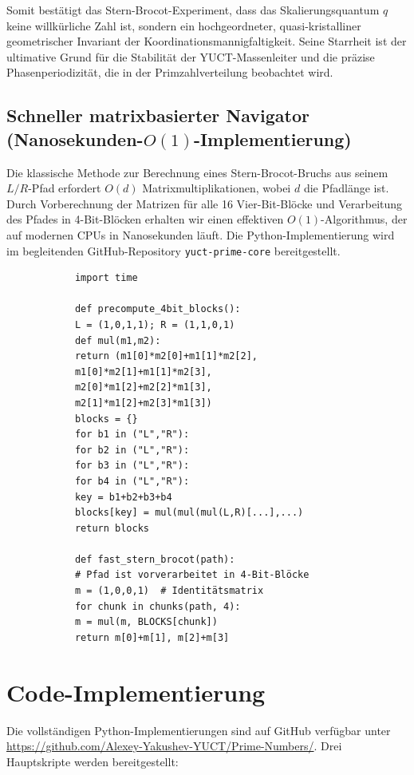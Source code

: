 \documentclass[11pt,a4paper]{article}
\begin{document}
	Somit bestätigt das Stern-Brocot-Experiment, dass das Skalierungsquantum \(q\) keine willkürliche Zahl ist, sondern ein hochgeordneter, quasi-kristalliner geometrischer Invariant der Koordinationsmannigfaltigkeit. Seine Starrheit ist der ultimative Grund für die Stabilität der YUCT-Massenleiter und die präzise Phasenperiodizität, die in der Primzahlverteilung beobachtet wird.
	
	\subsection{Schneller matrixbasierter Navigator (Nanosekunden-\(O(1)\)-Implementierung)}
	
	Die klassische Methode zur Berechnung eines Stern-Brocot-Bruchs aus seinem \(L/R\)-Pfad erfordert \(O(d)\) Matrixmultiplikationen, wobei \(d\) die Pfadlänge ist. Durch Vorberechnung der Matrizen für alle 16 Vier-Bit-Blöcke und Verarbeitung des Pfades in 4-Bit-Blöcken erhalten wir einen effektiven \(O(1)\)-Algorithmus, der auf modernen CPUs in Nanosekunden läuft. Die Python-Implementierung wird im begleitenden GitHub-Repository \texttt{yuct-prime-core} bereitgestellt.
	
	\begin{tcolorbox}[title=4-Bit-Block-Navigator (Python), breakable]
		\begin{lstlisting}
			import time
			
			def precompute_4bit_blocks():
			L = (1,0,1,1); R = (1,1,0,1)
			def mul(m1,m2):
			return (m1[0]*m2[0]+m1[1]*m2[2],
			m1[0]*m2[1]+m1[1]*m2[3],
			m2[0]*m1[2]+m2[2]*m1[3],
			m2[1]*m1[2]+m2[3]*m1[3])
			blocks = {}
			for b1 in ("L","R"):
			for b2 in ("L","R"):
			for b3 in ("L","R"):
			for b4 in ("L","R"):
			key = b1+b2+b3+b4
			blocks[key] = mul(mul(mul(L,R)[...],...)
			return blocks
			
			def fast_stern_brocot(path):
			# Pfad ist vorverarbeitet in 4-Bit-Blöcke
			m = (1,0,0,1)  # Identitätsmatrix
			for chunk in chunks(path, 4):
			m = mul(m, BLOCKS[chunk])
			return m[0]+m[1], m[2]+m[3]
		\end{lstlisting}
	\end{tcolorbox}
	
	\section{Code-Implementierung}
	\label{sec:code}
	Die vollständigen Python-Implementierungen sind auf GitHub verfügbar unter 
	\url{https://github.com/Alexey-Yakushev-YUCT/Prime-Numbers/}. Drei Hauptskripte werden bereitgestellt:
	
\end{document}
